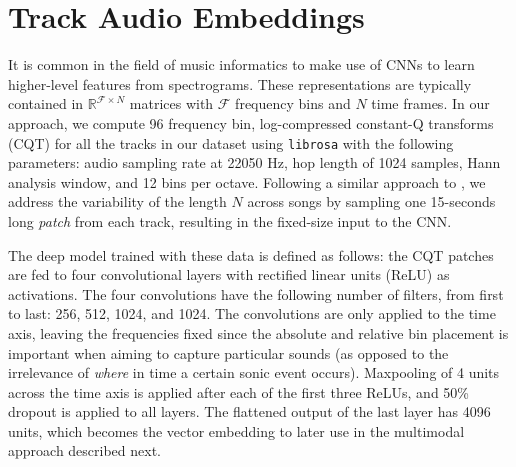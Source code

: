 \section{Track Audio Embeddings}\label{sec:cold-rec:audio}

It is common in the field of music informatics to make use of CNNs to learn higher-level features from spectrograms.
These representations are typically contained in $\mathbb{R}^{\mathcal{F} \times N}$ matrices with $\mathcal{F}$ frequency bins and $N$ time frames.
In our approach, we compute 96 frequency bin, log-compressed constant-Q transforms (CQT) \cite{Schorkhuber2010} for all the tracks in our dataset using \texttt{librosa} \cite{Mcfee2015} with the following parameters: audio sampling rate at 22050 Hz, hop length of 1024 samples, Hann analysis window, and 12 bins per octave.
Following a similar approach to \cite{Oord2013}, we address the variability of the length $N$ across songs by sampling one 15-seconds long \emph{patch} from each track, resulting in the fixed-size input to the CNN.

The deep model trained with these data is defined as follows: the CQT patches are fed to four convolutional layers with rectified linear units (ReLU) as activations.
The four convolutions have the following number of filters, from first to last: 256, 512, 1024, and 1024.
The convolutions are only applied to the time axis, leaving the frequencies fixed since the absolute and relative bin placement is important when aiming to capture particular sounds (as opposed to the irrelevance of \emph{where} in time a certain sonic event occurs).
Maxpooling of 4 units across the time axis is applied after each of the first three ReLUs, and 50\% dropout is applied to all layers.
The flattened output of the last layer has 4096 units, which becomes the vector embedding to later use in the multimodal approach described next.


